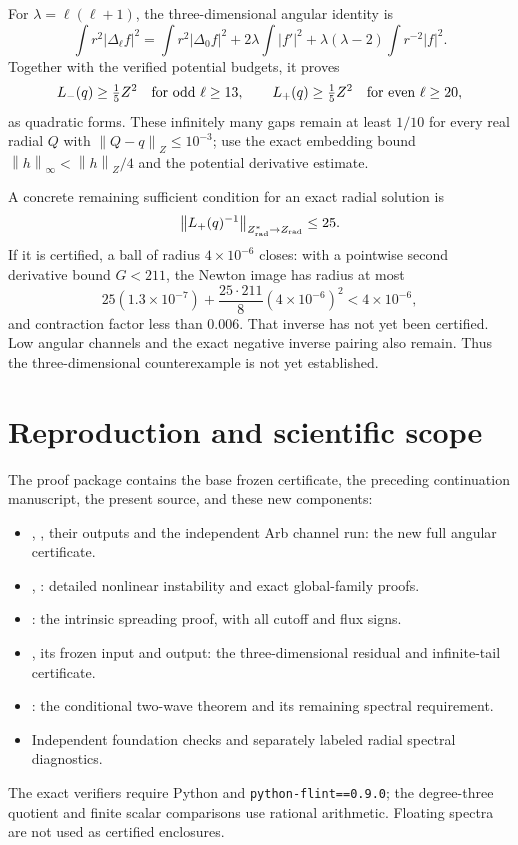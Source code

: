 \documentclass[11pt,a4paper]{article}
\theoremstyle{remark}\newtheorem{remark}[theorem]{Remark}
\newcommand{\norm}[1]{\left\|#1\right\|}
\begin{document}
For $\lambda=\ell(\ell+1)$, the three-dimensional angular identity is
\[
 \int r^2|\Delta_\ell f|^2=
 \int r^2|\Delta_0 f|^2+2\lambda\int|f'|^2
 +\lambda(\lambda-2)\int r^{-2}|f|^2.
\]
Together with the verified potential budgets, it proves
\[
 L_-(q)\ge\tfrac15 Z^2\quad\hbox{for odd }\ell\ge13,
 \qquad L_+(q)\ge\tfrac15 Z^2\quad\hbox{for even }\ell\ge20,
\]
as quadratic forms. These infinitely many gaps remain at least $1/10$ for every real radial $Q$ with $\norm{Q-q}_Z\le10^{-3}$; use the exact embedding bound $\norm h_\infty<\norm h_Z/4$ and the potential derivative estimate.

A concrete remaining sufficient condition for an exact radial solution is
\[
 \norm{L_+(q)^{-1}}_{Z^*_{\rm rad}\to Z_{\rm rad}}\le25.
\]
If it is certified, a ball of radius $4\times10^{-6}$ closes: with a pointwise second derivative bound $G<211$, the Newton image has radius at most
\[
 25(1.3\times10^{-7})+\frac{25\cdot211}{8}(4\times10^{-6})^2
 <4\times10^{-6},
\]
and contraction factor less than $0.006$. That inverse has not yet been certified. Low angular channels and the exact negative inverse pairing also remain. Thus the three-dimensional counterexample is not yet established.

\section{Reproduction and scientific scope}
The proof package contains the base frozen certificate, the preceding continuation manuscript, the present source, and these new components:
\begin{itemize}
\item {}, , their outputs and the independent Arb channel run: the new full angular certificate.
\item {}, : detailed nonlinear instability and exact global-family proofs.
\item {}: the intrinsic spreading proof, with all cutoff and flux signs.
\item {}, its frozen input and output: the three-dimensional residual and infinite-tail certificate.
\item {}: the conditional two-wave theorem and its remaining spectral requirement.
\item Independent foundation checks and separately labeled radial spectral diagnostics.
\end{itemize}
The exact verifiers require Python and \texttt{python-flint==0.9.0}; the degree-three quotient and finite scalar comparisons use rational arithmetic. Floating spectra are not used as certified enclosures.
\end{document}
